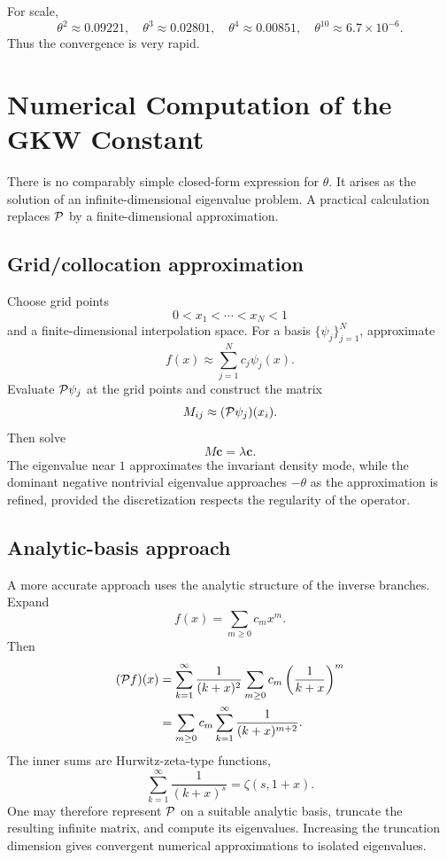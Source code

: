 \documentclass[a4paper]{article}
\begin{document}
For scale, 
\begin{equation}
\theta^2\approx0.09221,\quad
\theta^3\approx0.02801,\quad
\theta^4\approx0.00851,\quad
\theta^{10}\approx6.7\times10^{-6}.
\end{equation}
Thus the convergence is very rapid.

\section{Numerical Computation of the GKW Constant}
There is no comparably simple closed-form expression for $\theta$. It arises as the solution of an infinite-dimensional eigenvalue problem. A practical calculation replaces $\mathcal{P}$ by a finite-dimensional approximation.

\subsection{Grid/collocation approximation}
Choose grid points
\begin{equation}
 0<x_1<\cdots<x_N<1
\end{equation}
and a finite-dimensional interpolation space. For a basis $\{\psi_j\}_{j=1}^N$, approximate
\begin{equation}
 f(x)\approx\sum_{j=1}^Nc_j\psi_j(x).
\end{equation}
Evaluate $\mathcal{P}\psi_j$ at the grid points and construct the matrix
\begin{equation}
 M_{ij}\approx(\mathcal{P}\psi_j)(x_i).
\end{equation}
Then solve
\begin{equation}
 M\bm c=\lambda\bm c.
\end{equation}
The eigenvalue near $1$ approximates the invariant density mode, while the dominant negative nontrivial eigenvalue approaches $-\theta$ as the approximation is refined, provided the discretization respects the regularity of the operator.

\subsection{Analytic-basis approach}
A more accurate approach uses the analytic structure of the inverse branches. Expand
\begin{equation}
 f(x)=\sum_{m\ge0}c_mx^m.
\end{equation}
Then
\begin{align}
 (\mathcal{P} f)(x)
 &=\sum_{k=1}^{\infty}\frac1{(k+x)^2}
 \sum_{m\ge0}c_m\left(\frac1{k+x}\right)^m\\
 &=\sum_{m\ge0}c_m\sum_{k=1}^{\infty}\frac1{(k+x)^{m+2}}.
\end{align}
The inner sums are Hurwitz-zeta-type functions,
\begin{equation}
 \sum_{k=1}^{\infty}\frac1{(k+x)^s}=\zeta(s,1+x).
\end{equation}
One may therefore represent $\mathcal{P}$ on a suitable analytic basis, truncate the resulting infinite matrix, and compute its eigenvalues. Increasing the truncation dimension gives convergent numerical approximations to isolated eigenvalues.
\end{document}

